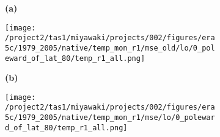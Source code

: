 \documentclass[preview]{standalone}
\begin{document}
\begin{figure}

  \begin{subfigure}[t]{0.05\textwidth}
    \textbf{\large{(a)}}
  \end{subfigure}
  \begin{subfigure}[t]{0.95\textwidth}
    \texttt{[image: /project2/tas1/miyawaki/projects/002/figures/era5c/1979\_2005/native/temp\_mon\_r1/mse\_old/lo/0\_poleward\_of\_lat\_80/temp\_r1\_all.png]}
  \end{subfigure}

  \begin{subfigure}[t]{0.05\textwidth}
    \textbf{\large{(b)}}
  \end{subfigure}
  \begin{subfigure}[t]{0.95\textwidth}
    \texttt{[image: /project2/tas1/miyawaki/projects/002/figures/era5c/1979\_2005/native/temp\_mon\_r1/mse/lo/0\_poleward\_of\_lat\_80/temp\_r1\_all.png]}
  \end{subfigure}
  
\end{figure}
  
\end{document}
